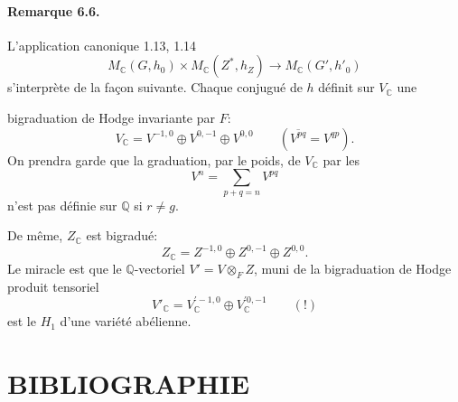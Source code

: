 \documentclass[10pt]{article}
\newcommand{\C}{\mathbb C}
\newcommand{\Q}{\mathbb Q}
\newcommand{\MC}{M_{\C}}
\begin{document}
\paragraph{Remarque 6.6.} L'application canonique 1.13, 1.14
\[
\tag{6.6.1}
\MC(G,h_0)\times\MC(Z^*,h_Z)\longrightarrow\MC(G',h'_0)
\]
s'interprète de la façon suivante. Chaque conjugué de $h$ définit sur $V_{\C}$ une




bigraduation de Hodge invariante par $F$:
\[
V_{\C}=V^{-1,0}\oplus V^{0,-1}\oplus V^{0,0}
\qquad(\overline{V^{pq}}=V^{qp}).
\]
On prendra garde que la graduation, par le poids, de $V_{\C}$ par les
\[
V^n=\sum_{p+q=n}V^{pq}
\]
n'est pas définie sur $\Q$ si $r\ne g$.

De même, $Z_{\C}$ est bigradué:
\[
Z_{\C}=Z^{-1,0}\oplus Z^{0,-1}\oplus Z^{0,0}.
\]
Le miracle est que le $\Q$-vectoriel $V'=V\otimes_F Z$, muni de la bigraduation de Hodge produit tensoriel
\[
V'_{\C}=V_{\C}^{\prime -1,0}\oplus V_{\C}^{\prime 0,-1}\qquad(!)
\]
est le $H_1$ d'une variété abélienne.

\section*{BIBLIOGRAPHIE}
\end{document}

